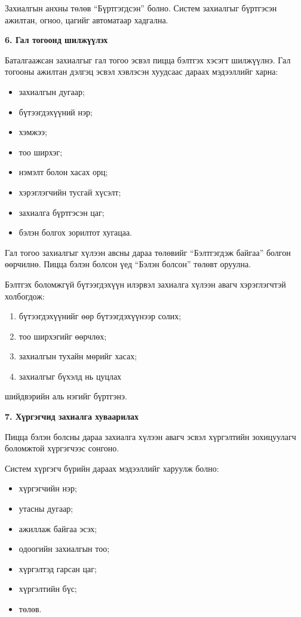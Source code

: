 Захиалгын анхны төлөв “Бүртгэгдсэн” болно. Систем захиалгыг бүртгэсэн ажилтан, огноо, цагийг автоматаар хадгална.

\textbf{6. Гал тогоонд шилжүүлэх}

Баталгаажсан захиалгыг гал тогоо эсвэл пицца бэлтгэх хэсэгт шилжүүлнэ. Гал тогооны ажилтан дэлгэц эсвэл хэвлэсэн хуудсаас дараах мэдээллийг харна:

\begin{itemize}
    \item захиалгын дугаар;
    \item бүтээгдэхүүний нэр;
    \item хэмжээ;
    \item тоо ширхэг;
    \item нэмэлт болон хасах орц;
    \item хэрэглэгчийн тусгай хүсэлт;
    \item захиалга бүртгэсэн цаг;
    \item бэлэн болгох зорилтот хугацаа.
\end{itemize}

Гал тогоо захиалгыг хүлээн авсны дараа төлөвийг “Бэлтгэгдэж байгаа” болгон өөрчилнө. Пицца бэлэн болсон үед “Бэлэн болсон” төлөвт оруулна.

Бэлтгэх боломжгүй бүтээгдэхүүн илэрвэл захиалга хүлээн авагч хэрэглэгчтэй холбогдож:

\begin{enumerate}
    \item бүтээгдэхүүнийг өөр бүтээгдэхүүнээр солих;
    \item тоо ширхэгийг өөрчлөх;
    \item захиалгын тухайн мөрийг хасах;
    \item захиалгыг бүхэлд нь цуцлах
\end{enumerate}

шийдвэрийн аль нэгийг бүртгэнэ.

\textbf{7. Хүргэгчид захиалга хуваарилах}

Пицца бэлэн болсны дараа захиалга хүлээн авагч эсвэл хүргэлтийн зохицуулагч боломжтой хүргэгчээс сонгоно.

Систем хүргэгч бүрийн дараах мэдээллийг харуулж болно:

\begin{itemize}
    \item хүргэгчийн нэр;
    \item утасны дугаар;
    \item ажиллаж байгаа эсэх;
    \item одоогийн захиалгын тоо;
    \item хүргэлтэд гарсан цаг;
    \item хүргэлтийн бүс;
    \item төлөв.
\end{itemize}

